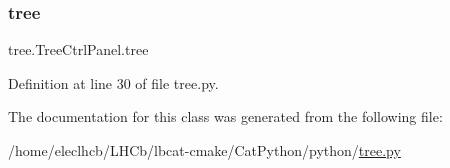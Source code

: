 \subsubsection{\texorpdfstring{tree}{tree}}
{\footnotesize\ttfamily tree.\+Tree\+Ctrl\+Panel.\+tree}



Definition at line 30 of file tree.\+py.



The documentation for this class was generated from the following file\+:\begin{DoxyCompactItemize}
\item 
/home/eleclhcb/\+L\+H\+Cb/lbcat-\/cmake/\+Cat\+Python/python/\hyperlink{tree_8py}{tree.\+py}\end{DoxyCompactItemize}
